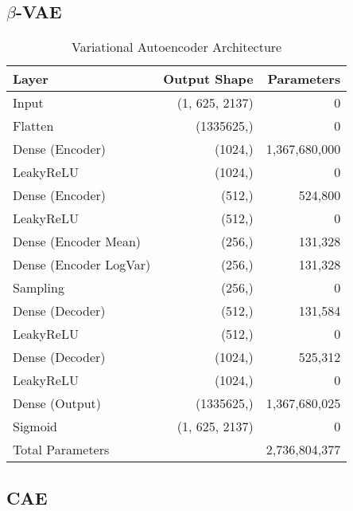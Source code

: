 \subsection{$\beta$-VAE}
\label{app:a-vae}

\begin{table}[!h]
    \centering
    \begin{tabular}{lrr}
        \toprule
        Layer & Output Shape & Parameters \\
        \midrule
        Input & (1, 625, 2137) & 0 \\
        Flatten & (1335625,) & 0 \\
        Dense (Encoder) & (1024,) & 1,367,680,000 \\
        LeakyReLU & (1024,) & 0 \\
        Dense (Encoder) & (512,) & 524,800 \\
        LeakyReLU & (512,) & 0 \\
        Dense (Encoder Mean) & (256,) & 131,328 \\
        Dense (Encoder LogVar) & (256,) & 131,328 \\
        Sampling & (256,) & 0 \\
        Dense (Decoder) & (512,) & 131,584 \\
        LeakyReLU & (512,) & 0 \\
        Dense (Decoder) & (1024,) & 525,312 \\
        LeakyReLU & (1024,) & 0 \\
        Dense (Output) & (1335625,) & 1,367,680,025 \\
        Sigmoid & (1, 625, 2137) & 0 \\
        \midrule
        Total Parameters & & 2,736,804,377 \\
        \bottomrule
    \end{tabular}
    \caption{Variational Autoencoder Architecture}
    \label{tab:vae}
\end{table}


\subsection{CAE}
\label{app:a-cae}

